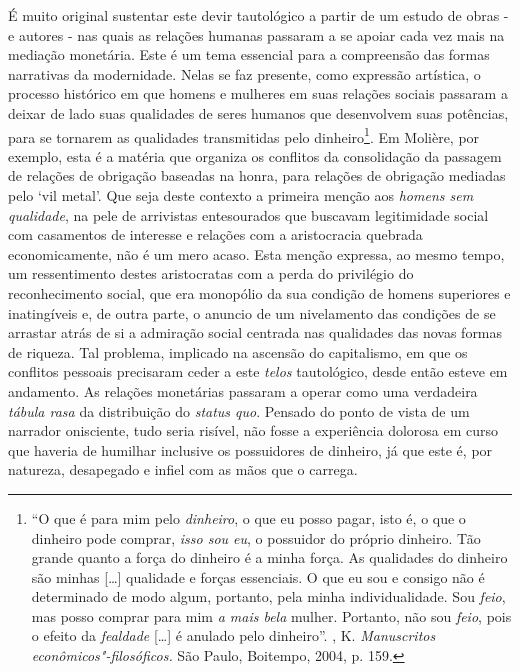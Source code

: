 É muito original sustentar este devir tautológico a partir de um estudo
de obras - e autores - nas quais as relações humanas passaram a se
apoiar cada vez mais na mediação monetária. Este é um tema essencial
para a compreensão das formas narrativas da modernidade. Nelas se faz
presente, como expressão artística, o processo histórico em que homens e
mulheres em suas relações sociais passaram a deixar de lado suas
qualidades de seres humanos que desenvolvem suas potências, para se
tornarem as qualidades transmitidas pelo dinheiro\footnote{``O que é
  para mim pelo \emph{dinheiro}, o que eu posso pagar, isto é, o que o
  dinheiro pode comprar, \emph{isso sou eu}, o possuidor do próprio
  dinheiro. Tão grande quanto a força do dinheiro é a minha força. As
  qualidades do dinheiro são minhas [\ldots{}] qualidade e forças
  essenciais. O que eu sou e consigo não é determinado de modo algum,
  portanto, pela minha individualidade. Sou \emph{feio}, mas posso
  comprar para mim \emph{a mais bela} mulher. Portanto, não sou
  \emph{feio}, pois o efeito da \emph{fealdade} [\ldots{}] é anulado
  pelo dinheiro''. , K. \emph{\emph{Manuscritos
  econômicos"-filosóficos}.} São Paulo, Boitempo, 2004, p. 159.}. Em
Molière, por exemplo, esta é a matéria que organiza os conflitos da
consolidação da passagem de relações de obrigação baseadas na honra,
para relações de obrigação mediadas pelo `vil metal'. Que seja deste
contexto a primeira menção aos \emph{homens sem qualidade}, na pele de
arrivistas entesourados que buscavam legitimidade social com casamentos
de interesse e relações com a aristocracia quebrada economicamente, não
é um mero acaso. Esta menção expressa, ao mesmo tempo, um ressentimento
destes aristocratas com a perda do privilégio do reconhecimento social,
que era monopólio da sua condição de homens superiores e inatingíveis e,
de outra parte, o anuncio de um nivelamento das condições de se arrastar
atrás de si a admiração social centrada nas qualidades das novas formas
de riqueza. Tal problema, implicado na ascensão do capitalismo, em que
os conflitos pessoais precisaram ceder a este \emph{telos} tautológico,
desde então esteve em andamento. As relações monetárias passaram a
operar como uma verdadeira \emph{tábula rasa} da distribuição do
\emph{status quo}. Pensado do ponto de vista de um narrador onisciente,
tudo seria risível, não fosse a experiência dolorosa em curso que
haveria de humilhar inclusive os possuidores de dinheiro, já que este é,
por natureza, desapegado e infiel com as mãos que o carrega.

